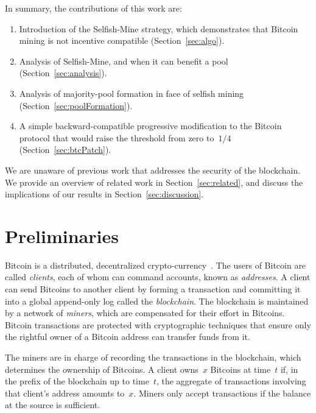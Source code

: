 \documentclass[letterpaper]{llncs}
\newcommand{\negspace}{\vspace{-0.5\baselineskip}}
\begin{document}
In summary, the contributions of this work are: 
\begin{enumerate} 
\item Introduction of the Selfish-Mine strategy, which demonstrates that Bitcoin mining is not incentive compatible (Section~\ref{sec:algo}). 

\item Analysis of Selfish-Mine, and when it can benefit a pool (Section~\ref{sec:analysis}). 

\item Analysis of majority-pool formation in face of selfish mining (Section~\ref{sec:poolFormation}). 

\item A simple backward-compatible progressive modification to the Bitcoin protocol that would raise the threshold from zero to~$1/4$ (Section~\ref{sec:btcPatch}). 
\end{enumerate} 

We are unaware of previous work that addresses the security of the blockchain. We provide an overview of related work in Section~\ref{sec:related}, and discuss the implications of our results in Section~\ref{sec:discussion}. 



    \section{Preliminaries} \label{sec:prelim} 
\negspace

Bitcoin is a distributed, decentralized crypto-currency~\cite{bitcoin2013protocol,bitcoin2013rules,nakamoto2008bitcoin,bitcoin2013source}. 
The users of Bitcoin are called \emph{clients}, each of whom can command accounts, known as \emph{addresses}. A client can send Bitcoins to another client by forming a transaction and committing it into a global append-only log called the \emph{blockchain}. The blockchain is maintained by a network of \emph{miners}, which are compensated for their effort in Bitcoins. Bitcoin transactions are protected with cryptographic techniques that ensure only the rightful owner of a Bitcoin address can transfer funds from it. 

The miners are in charge of recording the transactions in the blockchain, which determines the ownership of Bitcoins. 
A client owns~$x$ Bitcoins at time~$t$ if, in the prefix of the blockchain up to time~$t$, the aggregate of transactions involving that client's address amounts to~$x$. 
Miners only accept transactions if the balance at the source is sufficient. 
\end{document}
